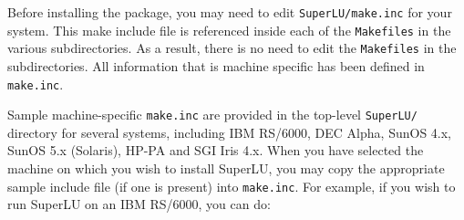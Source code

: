 Before installing the package, you may need to edit {\tt SuperLU/make.inc}
for your system.
This make include file is referenced inside each of the {\tt Makefiles}
in the various subdirectories. As a result, there is no need to 
edit the {\tt Makefiles} in the subdirectories. All information that is
machine specific has been defined in {\tt make.inc}.

Sample machine-specific {\tt make.inc} are provided 
in the top-level {\tt SuperLU/} directory for several systems, including
IBM RS/6000, DEC Alpha, SunOS 4.x, SunOS 5.x (Solaris), HP-PA and
SGI Iris 4.x.  When you have selected the machine on which you wish 
to install SuperLU, you may copy the appropriate sample include file 
(if one is present) into {\tt make.inc}. For example, if you wish to run 
SuperLU on an IBM RS/6000, you can do:

\hspace{.4in}{\tt cp make.rs6k make.inc}

